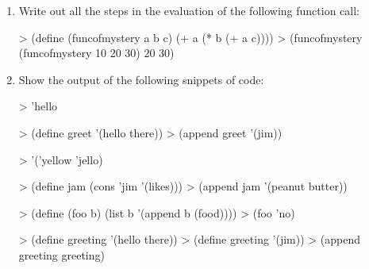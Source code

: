 \documentclass[pdftex,11pt]{article}
\begin{document}
\begin{enumerate}
\newpage

\item Write out all the steps in the evaluation of the following
  function call:
\begin{answer}
> (define (funcofmystery a b c)
    (+ a (* b (+ a c))))
> (funcofmystery (funcofmystery 10 20 30) 20 30)







\end{answer}

\item Show the output of the following snippets of code:

\begin{minipage}{0.4\textwidth}
\begin{answer}
> 'hello

\underline{                          }
\end{answer}
\end{minipage}
\hspace{.02in}
\begin{minipage}{0.5\textwidth}
\begin{answer}
> (define greet '(hello there))
> (append greet '(jim))

\underline{                          }
\end{answer}
\end{minipage}

\begin{minipage}{0.4\textwidth}
\begin{answer}
> '('yellow 'jello)

\underline{                         }
\end{answer}
\end{minipage}
\hspace{.02in}
\begin{minipage}{0.5\textwidth}
\begin{answer}
> (define jam (cons 'jim '(likes)))
> (append jam '(peanut butter))

\underline{                         }
\end{answer}
\end{minipage}

\begin{minipage}{0.4\textwidth}
\begin{answer}
> (define (foo b)
    (list b '(append b (food))))
> (foo 'no)

\underline{                         }
\end{answer}
\end{minipage}
\hspace{.02in}
\begin{minipage}{0.5\textwidth}
\begin{answer}
> (define greeting '(hello there))
> (define greeting '(jim))
> (append greeting greeting)


\end{answer}
\end{minipage}
\end{enumerate}
\end{document}
